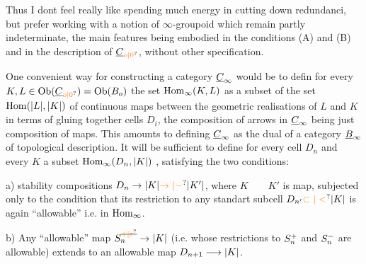 Thus I dont feel really like spending much energy in cutting down redundanci, but prefer working with a notion of $\infty$-groupoid which remain partly indeterminate, the main features being embodied in the conditions (A) and (B) and in the description of $\underline{C}_{\unsure{o|0}}$, without other specification.


 One convenient way for constructing  a category $\underline{C}_{\infty}$ would be to defin for every $K,L\handwritten{\in}\operatorname{Ob}(\underline{C}_{\unsure{o|0}})=\operatorname{Ob}(B_o)$ the set $\operatorname{Hom}_{\infty}(K,L)$ as a subset of the set $\operatorname{Hom}(|L|,|K|)$ of continuous maps  between the geometric realisations of $L$ and $K$ in terms of gluing together cells $D_i$, the composition of arrows in $\underline{C}_{\infty}$ being just composition of maps. This amounts to defining $\underline{C}_{\infty}$ as  the dual of a category $\underline{B}_{\infty}$ of topological description. It will be sufficient to define for every cell $D_n$ and every $K$ a subset $\operatorname{Hom}_{\infty}(D_n,|K|)$ , satisfying the two conditions:

a) stability  compositions $D_n\handwritten{\to|}K\handwritten{|}\handwritten{\unsure{\to|-}} \handwritten{|}K'\handwritten{|}$, where $K\qquad K'$ is  map,  subjected only to the condition that its restriction to any standart subcell $D_{n'}\handwritten{\unsure{\subset|<}|}K\handwritten{|}$ is again ``allowable'' i.e. in $\operatorname{Hom}_{\infty}$.

b) Any ``allowable'' map $S_n^{\deleted{\unsure{+|\varepsilon}}}\handwritten{\to|}K\handwritten{|}$ (i.e. whose restrictions to $S_n^{+}$ and $S_n^{-}$ are allowable) extends to an allowable map $D_{n+1}\longrightarrow|K|$.

